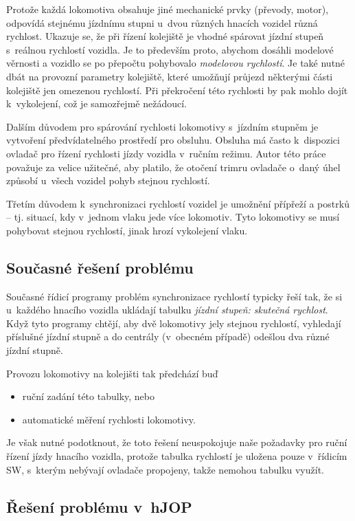 Protože každá lokomotiva obsahuje jiné mechanické prvky (převody, motor),
odpovídá stejnému jízdnímu stupni u~dvou různých hnacích vozidel různá
rychlost. Ukazuje se, že při řízení kolejiště je vhodné spárovat jízdní stupeň
s~reálnou rychlostí vozidla. Je to především proto, abychom dosáhli modelové
věrnosti a vozidlo se po přepočtu pohybovalo \textit{modelovou rychlostí}. Je
také nutné dbát na provozní parametry kolejiště, které umožňují průjezd
některými části kolejiště jen omezenou rychlostí. Při překročení této rychlosti
by pak mohlo dojít k~vykolejení, což je samozřejmě nežádoucí.

Dalším důvodem pro spárování rychlosti lokomotivy s~jízdním stupněm je
vytvoření předvídatelného prostředí pro obsluhu. Obsluha má často k~dispozici
ovladač pro řízení rychlosti jízdy vozidla v~ručním režimu. Autor této práce
považuje za velice užitečné, aby platilo, že otočení trimru ovladače o~daný
úhel způsobí u~všech vozidel pohyb stejnou rychlostí.

Třetím důvodem k~synchronizaci rychlostí vozidel je umožnění přípřeží a postrků
-- tj.  situací, kdy v~jednom vlaku jede více lokomotiv. Tyto lokomotivy se
musí pohybovat stejnou rychlostí, jinak hrozí vykolejení vlaku.

\subsection{Současné řešení problému}

Současné řídicí programy problém synchronizace rychlostí typicky řeší tak, že
si u~každého hnacího vozidla ukládají tabulku \textit{jízdní stupeň: skutečná
rychlost}. Když tyto programy chtějí, aby dvě lokomotivy jely stejnou rychlostí,
vyhledají příslušné jízdní stupně a do centrály (v~obecném případě) odešlou
dva různé jízdní stupně.

Provozu lokomotivy na kolejišti tak předchází buď

\begin{itemize}
	\item ruční zadání této tabulky, nebo
	\item automatické měření rychlosti lokomotivy.
\end{itemize}

Je však nutné podotknout, že toto řešení neuspokojuje naše požadavky pro
ruční řízení jízdy hnacího vozidla, protože tabulka rychlostí je uložena
pouze v~řídicím SW, s~kterým nebývají ovladače propojeny, takže nemohou tabulku
využít.

\subsection{Řešení problému v~hJOP}

